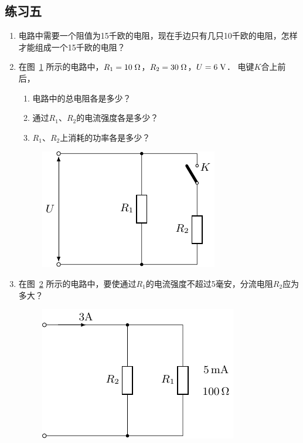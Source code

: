 \subsection*{练习五}
\begin{enumerate}
    \item 电路中需要一个阻值为15千欧的电阻，现在手边只有几只10千欧的电阻，怎样才能组成一个15千欧的电阻？
    \item 在图~\ref{fig_B_7-13} 所示的电路中，$R_1=10\;\Omega$，$R_2=30\;\Omega$，$U=6\;\text{V}$．
    电键$K$合上前后，
    \begin{enumerate}
        \item 电路中的总电阻各是多少？
        \item 通过$R_1$、$R_2$的电流强度各是多少？
        \item $R_1$、$R_2$上消耗的功率各是多少？
    \end{enumerate}
    \begin{figure}[htbp]
    	\centering
    	\includegraphics{fig/B/7-13.pdf}
    	\caption{}\label{fig_B_7-13}
    \end{figure}
    \item 在图~\ref{fig_B_7-14} 所示的电路中，要使通过$R_1$的电流强度不超过5毫安，分流电阻$R_2$应为多大？
    \begin{figure}[htbp]
    	\centering
    	\begin{minipage}[t]{0.48\textwidth}
    		\centering
    		\includegraphics{fig/B/7-14.pdf}
    		\caption{}\label{fig_B_7-14}

\end{minipage}
\end{figure}
\end{enumerate}
